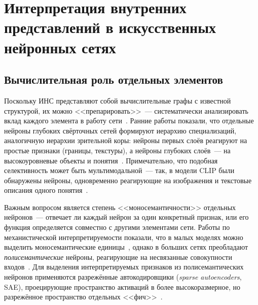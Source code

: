 
\section{Интерпретация внутренних представлений в искусственных нейронных сетях}\label{sec: lit_ann_repr}


\subsection{Вычислительная роль отдельных элементов}\label{sec:ann_individual}

Поскольку ИНС представляют собой вычислительные графы с известной структурой, их можно <<препарировать>>~--- систематически анализировать вклад каждого элемента в работу сети~\cite{bau2017network, Olah2017}. Ранние работы показали, что отдельные нейроны глубоких свёрточных сетей формируют иерархию специализаций, аналогичную иерархии зрительной коры: нейроны первых слоёв реагируют на простые признаки (границы, текстуры), а нейроны глубоких слоёв~--- на высокоуровневые объекты и понятия~\cite{erhan2009visualizing, Olah2017}. Примечательно, что подобная селективность может быть мультимодальной~--- так, в модели CLIP были обнаружены нейроны, одновременно реагирующие на изображения и текстовые описания одного понятия~\cite{goh2021multimodal}.

Важным вопросом является степень <<моносемантичности>> отдельных нейронов~--- отвечает ли каждый нейрон за один конкретный признак, или его функция определяется совместно с другими элементами сети. Работы по механистической интерпретируемости показали, что в малых моделях можно выделить моносемантические единицы~\cite{Anthropic2023monosemanticity}, однако в больших сетях преобладают \textit{полисемантические} нейроны, реагирующие на несвязанные совокупности входов~\cite{Templeton2024scaling}. Для выделения интерпретируемых признаков из полисемантических нейронов применяются разрежённые автокодировщики (\textit{sparse autoencoders}, SAE), проецирующие пространство активаций в более высокоразмерное, но разрежённое пространство отдельных <<фич>>~\cite{Templeton2024scaling}.

